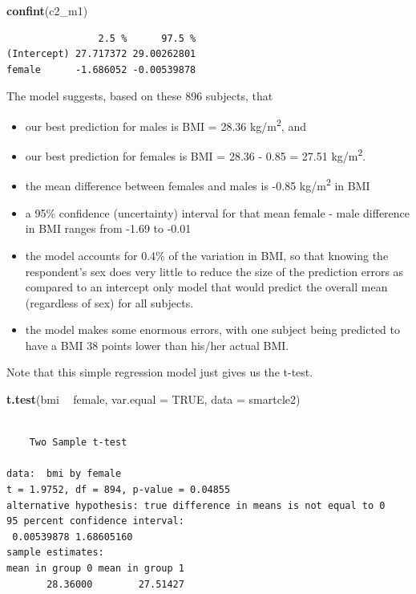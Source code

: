 \documentclass[]{book}
\newenvironment{Shaded}{\begin{snugshade}}{\end{snugshade}}
\newcommand{\KeywordTok}[1]{\textcolor[rgb]{0.13,0.29,0.53}{\textbf{#1}}}
\newcommand{\DataTypeTok}[1]{\textcolor[rgb]{0.13,0.29,0.53}{#1}}
\newcommand{\StringTok}[1]{\textcolor[rgb]{0.31,0.60,0.02}{#1}}
\newcommand{\OtherTok}[1]{\textcolor[rgb]{0.56,0.35,0.01}{#1}}
\newcommand{\OperatorTok}[1]{\textcolor[rgb]{0.81,0.36,0.00}{\textbf{#1}}}
\newcommand{\NormalTok}[1]{#1}
\providecommand{\tightlist}{%
  \setlength{\itemsep}{0pt}\setlength{\parskip}{0pt}}
\theoremstyle{definition}
\theoremstyle{definition}
\theoremstyle{definition}
\theoremstyle{remark}
\begin{document}
\begin{Shaded}
\begin{Highlighting}[]
\KeywordTok{confint}\NormalTok{(c2_m1)}
\end{Highlighting}
\end{Shaded}

\begin{verbatim}
                2.5 %      97.5 %
(Intercept) 27.717372 29.00262801
female      -1.686052 -0.00539878
\end{verbatim}

The model suggests, based on these 896 subjects, that

\begin{itemize}
\tightlist
\item
  our best prediction for males is BMI = 28.36 kg/m\textsuperscript{2},
  and
\item
  our best prediction for females is BMI = 28.36 - 0.85 = 27.51
  kg/m\textsuperscript{2}.
\item
  the mean difference between females and males is -0.85
  kg/m\textsuperscript{2} in BMI
\item
  a 95\% confidence (uncertainty) interval for that mean female - male
  difference in BMI ranges from -1.69 to -0.01
\item
  the model accounts for 0.4\% of the variation in BMI, so that knowing
  the respondent's sex does very little to reduce the size of the
  prediction errors as compared to an intercept only model that would
  predict the overall mean (regardless of sex) for all subjects.
\item
  the model makes some enormous errors, with one subject being predicted
  to have a BMI 38 points lower than his/her actual BMI.
\end{itemize}

Note that this simple regression model just gives us the t-test.

\begin{Shaded}
\begin{Highlighting}[]
\KeywordTok{t.test}\NormalTok{(bmi }\OperatorTok{~}\StringTok{ }\NormalTok{female, }\DataTypeTok{var.equal =} \OtherTok{TRUE}\NormalTok{, }\DataTypeTok{data =}\NormalTok{ smartcle2)}
\end{Highlighting}
\end{Shaded}

\begin{verbatim}

    Two Sample t-test

data:  bmi by female
t = 1.9752, df = 894, p-value = 0.04855
alternative hypothesis: true difference in means is not equal to 0
95 percent confidence interval:
 0.00539878 1.68605160
sample estimates:
mean in group 0 mean in group 1 
       28.36000        27.51427 
\end{verbatim}
\end{document}
